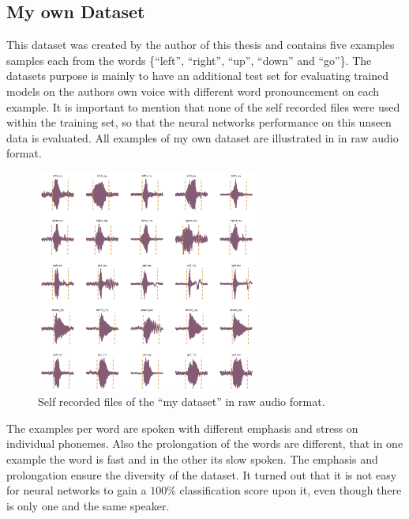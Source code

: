 \subsection{My own Dataset}\label{sec:exp_dataset_my}
This dataset was created by the author of this thesis and contains five examples samples each from the words \{\enquote{left}, \enquote{right}, \enquote{up}, \enquote{down} and \enquote{go}\}.
The datasets purpose is mainly to have an additional test set for evaluating trained models on the authors own voice with different word pronouncement on each example.
It is important to mention that none of the self recorded files were used within the training set, so that the neural networks performance on this unseen data is evaluated.
All examples of my own dataset are illustrated in  in raw audio format.
\begin{figure}[!ht]
  \centering
    \includegraphics[width=0.65\textwidth]{./5_exp/figs/exp_dataset_wav_grid_my}
  \caption{Self recorded files of the \enquote{my dataset} in raw audio format.}
  \label{fig:exp_dataset_wav_grid_my}
\end{figure}
\FloatBarrier
\noindent
The examples per word are spoken with different emphasis and stress on individual phonemes.
Also the prolongation of the words are different, that in one example the word is fast and in the other its slow spoken.
The emphasis and prolongation ensure the diversity of the dataset. 
It turned out that it is not easy for neural networks to gain a $100\%$ classification score upon it, even though there is only one and the same speaker.

